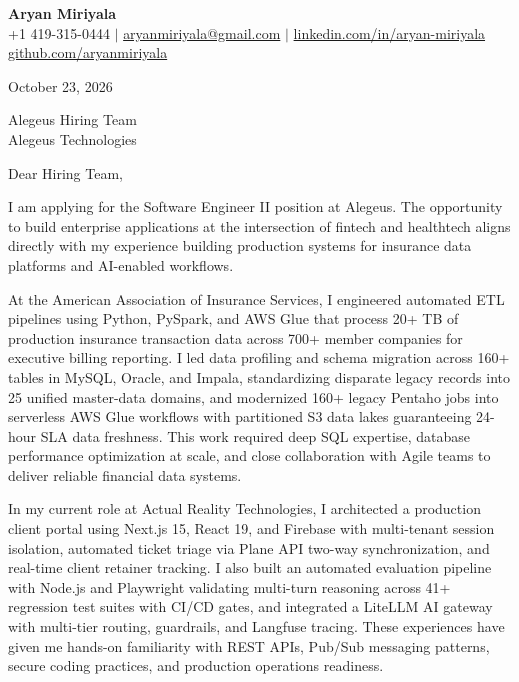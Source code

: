 \documentclass[letterpaper,11pt]{article}
\begin{document}
\begin{center}
  {\LARGE \textbf{Aryan Miriyala}}\\[4pt]
  \small
  +1 419-315-0444 $|$ \href{mailto:aryanmiriyala@gmail.com}{aryanmiriyala@gmail.com} $|$ \href{https://www.linkedin.com/in/aryan-miriyala-7788a21b6/}{linkedin.com/in/aryan-miriyala}\\
  \href{https://github.com/aryanmiriyala}{github.com/aryanmiriyala}
\end{center}

\vspace{12pt}

\noindent
October 23, 2026

\vspace{12pt}

\noindent
Alegeus Hiring Team\\
Alegeus Technologies

\vspace{12pt}

\noindent
Dear Hiring Team,

\vspace{8pt}

\noindent
I am applying for the Software Engineer II position at Alegeus. The opportunity to build enterprise applications at the intersection of fintech and healthtech aligns directly with my experience building production systems for insurance data platforms and AI-enabled workflows.

\vspace{8pt}

\noindent
At the American Association of Insurance Services, I engineered automated ETL pipelines using Python, PySpark, and AWS Glue that process 20+ TB of production insurance transaction data across 700+ member companies for executive billing reporting. I led data profiling and schema migration across 160+ tables in MySQL, Oracle, and Impala, standardizing disparate legacy records into 25 unified master-data domains, and modernized 160+ legacy Pentaho jobs into serverless AWS Glue workflows with partitioned S3 data lakes guaranteeing 24-hour SLA data freshness. This work required deep SQL expertise, database performance optimization at scale, and close collaboration with Agile teams to deliver reliable financial data systems.

\vspace{8pt}

\noindent
In my current role at Actual Reality Technologies, I architected a production client portal using Next.js 15, React 19, and Firebase with multi-tenant session isolation, automated ticket triage via Plane API two-way synchronization, and real-time client retainer tracking. I also built an automated evaluation pipeline with Node.js and Playwright validating multi-turn reasoning across 41+ regression test suites with CI/CD gates, and integrated a LiteLLM AI gateway with multi-tier routing, guardrails, and Langfuse tracing. These experiences have given me hands-on familiarity with REST APIs, Pub/Sub messaging patterns, secure coding practices, and production operations readiness.
\end{document}
